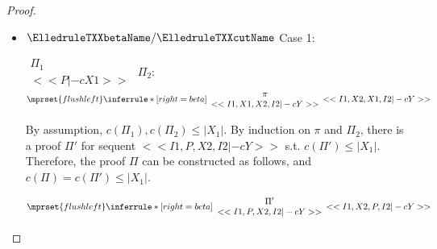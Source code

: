 \begin{proof}
\begin{enumerate}
\begin{itemize}
    \item $\ElledruleTXXbetaName / \ElledruleTXXcutName$ Case 1:
      \begin{center}
        \scriptsize
        \begin{math}
          \begin{array}{c}
            \Pi_1 \\
            {<<P |-c X1>>}
          \end{array}
        \end{math}
        \qquad\qquad
        $\Pi_2$:
        \begin{math}
          $$\mprset{flushleft}
          \inferrule* [right={\tiny beta}] {
            {
              \begin{array}{c}
                \pi \\
                {<<I1, X1, X2, I2 |-c Y>>}
              \end{array}
            }
          }{<<I1, X2, X1, I2 |-c Y>>}
        \end{math}
      \end{center}
      By assumption, $c(\Pi_1),c(\Pi_2)\leq |X_1|$. By induction on $\pi$ and $\Pi_2$, there is
      a proof $\Pi'$ for sequent $<<I1, P, X2, I2 |-c Y>>$ s.t. $c(\Pi')\leq |X_1|$. Therefore,
      the proof $\Pi$ can be constructed as follows, and $c(\Pi)=c(\Pi')\leq |X_1|$.
      \begin{center}
        \scriptsize
        \begin{math}
          $$\mprset{flushleft}
          \inferrule* [right={\tiny beta}] {
            {
              \begin{array}{c}
                \Pi' \\
                {<<I1, P, X2, I2 |-c Y>>}
              \end{array}
            }
          }{<<I1, X2, P, I2 |-c Y>>}
        \end{math}
      \end{center}


\end{itemize}
\end{enumerate}
\end{proof}
